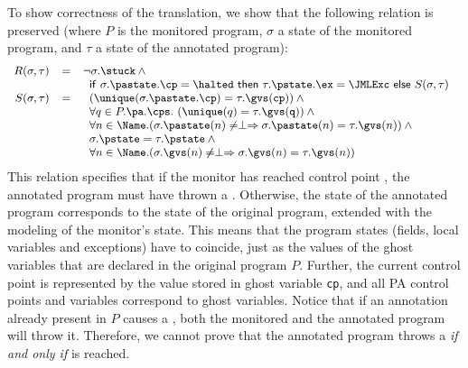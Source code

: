 To show correctness of the translation, we show that the following
relation is preserved (where \(P\) is the monitored program,
\(\sigma\) a state of the monitored program, and \(\tau\) a state
of the annotated program):
\[{\small
\begin{array}{rcl}
R(\sigma, \tau) & = & \neg \sigma.\stuck \:\wedge\\
& & \begin{array}[t]{l}
\mathsf{if\ }\sigma.\pastate.\cp = \halted
\mathsf{\ then\ }\tau.\pstate.\ex = \JMLExc
\mathsf{\ else\ }S(\sigma, \tau)
\end{array}\\
S(\sigma, \tau) & = &
\begin{array}[t]{l}
(\unique(\sigma.\pastate.\cp) = \tau.\gvs(\texttt{cp})) \:\wedge\\
\forall q \in P.\pa.\cps.\ (\unique(q) = \tau.\gvs(\texttt{q})) \:\wedge\\
\forall n \in \Name. (\sigma.\pastate(n) \not= \perp \Rightarrow
\sigma.\pastate(n) = \tau.\gvs(n)) \:\wedge\\
\sigma.\pstate = \tau.\pstate \:\wedge\\
\forall n \in \Name. (\sigma.\gvs(n) \not= \perp \Rightarrow
\sigma.\gvs(n) = \tau.\gvs(n))
\end{array}
\end{array}}
\]
This relation specifies that if the monitor has reached
control point  \halted, the annotated program must have thrown a
\JMLExc. Otherwise, the state of the annotated program corresponds to
the state of the original program, extended with the modeling of the
monitor's state. This means that the program states (fields,
local variables and exceptions) have to coincide, just as the values
of the ghost variables that are declared in the original program
\(P\). Further, the current control point is represented by the value
stored in ghost variable \texttt{cp}, and all PA control points and
variables correspond to ghost variables. Notice that if an annotation
already present in \(P\) causes a \JMLExc, both the monitored and the
annotated program will throw it.  Therefore, we cannot prove that the
annotated program throws a \JMLExc \emph{if and only if} \halted is
reached.

